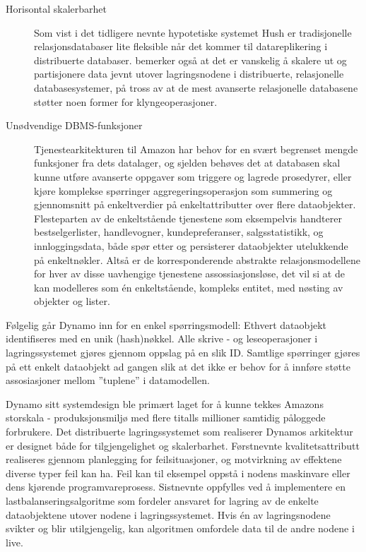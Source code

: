 \begin{description}
  \item [Horisontal skalerbarhet] Som vist i det tidligere nevnte hypotetiske systemet Hush \citep{george2011} er tradisjonelle relasjonsdatabaser lite fleksible når det kommer til datareplikering i distribuerte databaser. \cite{decandia2007} bemerker også at det er vanskelig å skalere ut og partisjonere data jevnt utover lagringsnodene i distribuerte, relasjonelle databasesystemer, på tross av at de mest avanserte relasjonelle databasene støtter noen former for klyngeoperasjoner.
  \item [Unødvendige DBMS-funksjoner] Tjenestearkitekturen til Amazon har behov for en svært begrenset mengde funksjoner fra dets datalager, og sjelden behøves det at databasen skal kunne utføre avanserte oppgaver som triggere og lagrede prosedyrer, eller kjøre komplekse spørringer aggregeringsoperasjon som summering og gjennomsnitt på enkeltverdier på enkeltattributter over flere dataobjekter. Flesteparten av de enkeltstående tjenestene som eksempelvis handterer bestselgerlister, handlevogner, kundepreferanser, salgsstatistikk, og innloggingsdata, både spør etter og persisterer dataobjekter utelukkende på enkeltnøkler. Altså er de korresponderende abstrakte relasjonsmodellene for hver av disse uavhengige tjenestene assossiasjonsløse, det vil si at de kan modelleres som én enkeltstående, kompleks entitet, med nøsting av objekter og lister.
\end{description}

Følgelig går Dynamo inn for en enkel spørringsmodell: Ethvert dataobjekt identifiseres med en unik (hash)nøkkel. Alle skrive - og leseoperasjoner i lagringssystemet gjøres gjennom oppslag på en slik ID. Samtlige spørringer gjøres på ett enkelt dataobjekt ad gangen slik at det ikke er behov for å innføre støtte assosiasjoner mellom ''tuplene'' i datamodellen.  %

Dynamo sitt systemdesign ble primært laget for å kunne tekkes Amazons storskala - produksjonsmiljø med flere titalls millioner samtidig påloggede forbrukere. Det distribuerte lagringssystemet som realiserer Dynamos arkitektur er designet både for tilgjengelighet og skalerbarhet. Førstnevnte kvalitetsattributt realiseres gjennom planlegging for feilsituasjoner, og motvirkning av effektene diverse typer feil kan ha. Feil kan til eksempel oppstå i nodens maskinvare eller dens kjørende programvareprosess. Sistnevnte oppfylles ved å implementere en lastbalanseringsalgoritme som fordeler ansvaret for lagring av de enkelte dataobjektene utover nodene i lagringssystemet. Hvis én av lagringsnodene svikter og blir utilgjengelig, kan algoritmen omfordele data til de andre nodene i live.


